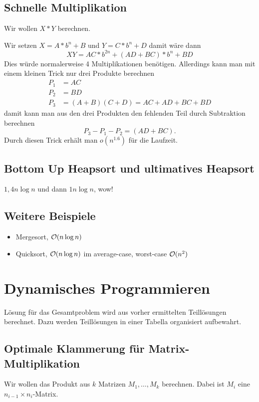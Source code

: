 \subsection{Schnelle Multiplikation}
Wir wollen $X*Y$ berechnen.

Wir setzen $X=A*b^n+B$ und $Y=C*b^n+D$ damit wäre dann
\begin{equation*}
	XY=AC*b^{2n}+(AD+BC)*b^n+BD
\end{equation*}
Dies würde normalerweise 4 Multiplikationen benötigen. Allerdings kann man mit einem kleinen Trick nur drei Produkte berechnen
\begin{align*}
	P_1&=AC\\
	P_2&=BD\\
	P_3&=(A+B)(C+D)=AC+AD+BC+BD
\end{align*}
damit kann man aus den drei Produkten den fehlenden Teil durch Subtraktion berechnen
\begin{equation*}
	P_3-P_1-P_2=(AD+BC).
\end{equation*}
Durch diesen Trick erhält man $o(n^{1.6})$ für die Laufzeit.


\subsection{Bottom Up Heapsort und ultimatives Heapsort}
$1,4n\log n$ und dann $1n\log n$, wow!


\subsection{Weitere Beispiele}
\begin{itemize}
	\item Mergesort, $\mathcal O(n\log n)$
	\item Quicksort, $\mathcal O(n\log n)$ im average-case, worst-case $\mathcal O(n^2)$
\end{itemize}



\section{Dynamisches Programmieren}
Lösung für das Gesamtproblem wird aus vorher ermittelten Teillösungen berechnet. Dazu werden Teillösungen in einer Tabella organisiert aufbewahrt.

\subsection{Optimale Klammerung für Matrix-Multiplikation}
Wir wollen das Produkt aus $k$ Matrizen $M_1,\ldots,M_k$ berechnen. Dabei ist $M_i$ eine $n_{i-1}\times n_i$-Matrix.

